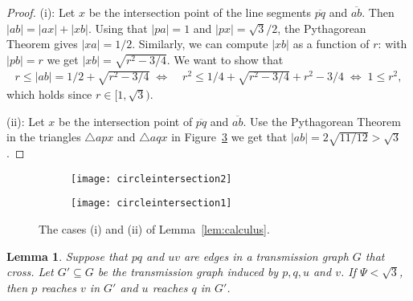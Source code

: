 \documentclass[11pt,a4paper]{paper}
\newtheorem{lemma}[theorem]{Lemma}
\begin{document}
\begin{proof}
(i): Let  $x$ be the intersection point
of the line segments $\overline{pq}$ and $\overline{ab}$.
Then $|ab| = |ax| + |xb|$.
Using that $|pa| = 1$ and $|px| = \sqrt{3}/2$, the Pythagorean Theorem
gives $|xa| = 1/2$. Similarly, we can compute $|xb|$ as a function of $r$:
 with $|pb| = r$ we get $|xb| = \sqrt{r^2 - 3/4}$.
We want to show that
\begin{align*}
 r \leq |ab|  = 1/2 + \sqrt{r^2 - 3/4}
\; \Leftrightarrow \; & r^2 \leq 1/4 + \sqrt{r^2 - 3/4} + r^2 - 3/4
\; \Leftrightarrow \;  1 \leq r^2,
\end{align*}
which holds since $r \in [1,\sqrt{3})$.

(ii): Let  $x$ be the intersection point
of $\overline{pq}$ and $\overline{ab}$.
Use the Pythagorean Theorem in the triangles $\triangle apx$ and $\triangle aqx$ in  Figure~\ref{fig:calculusa}
we get that $|ab| = 2\sqrt{11/12} > \sqrt{3}$.
\end{proof}

\begin{figure}[hbt]
\centering
\begin{subfigure}[b]{0.5\textwidth}
\centering
  \texttt{[image: circleintersection2]}
  \caption{}
\label{fig:calculusa1}
\end{subfigure}
\begin{subfigure}[b]{0.45\textwidth}
  \texttt{[image: circleintersection1]}
\caption{}
\label{fig:calculusa}
\end{subfigure}
\caption{The cases (i) and (ii) of Lemma~\ref{lem:calculus}.}
\end{figure}


\begin{lemma}
\label{lem:resolving}
Suppose that $pq$ and $uv$ are
edges in a transmission graph $G$ that cross.
Let $G'\subseteq G$ be the transmission graph induced by
$p,q,u$ and $v$.  If $\Psi < \sqrt{3}$, then $p$ reaches $v$ in
$G'$ and $u$ reaches $q$ in $G'$.
\end{lemma}
\end{document}
